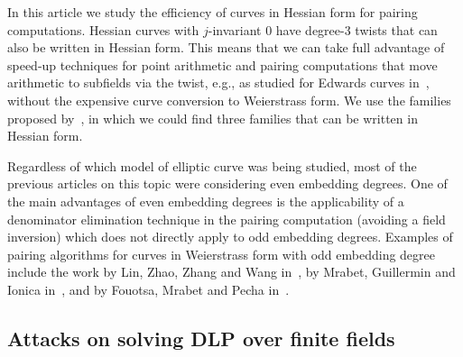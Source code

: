 In this article we study the efficiency of curves in Hessian form for pairing computations. 
Hessian curves with $j$-invariant 0 have degree-3 twists that can also be written in Hessian form. This
means that we can take full advantage of speed-up techniques for
point arithmetic and pairing computations that move arithmetic to subfields
via the twist, e.g., as studied for Edwards curves in~\cite{2014/LWZ},
without the expensive curve conversion to Weierstrass form.
We use the families proposed by~\cite{2010/freeman}, in which we could find
three families that can be written in Hessian form.

Regardless of which model of elliptic curve was being studied,
most of the previous articles on this topic were considering even embedding degrees.
One of the main advantages of even embedding degrees is the applicability of a denominator elimination technique in the pairing computation 
(avoiding a field inversion)
which does not directly apply to odd embedding degrees.
Examples of pairing algorithms for curves in Weierstrass form with odd embedding degree include
the work by Lin, Zhao, Zhang and Wang in~\cite{2008/lin}, by Mrabet, Guillermin and Ionica in~\cite{2009/deg15},
and by Fouotsa, Mrabet and Pecha in~\cite{2016/degodd}.

\subsection{Attacks on solving DLP over finite fields}


